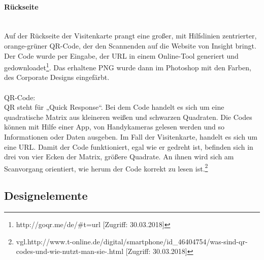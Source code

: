 \paragraph{Rückseite}
\leavevmode \\
Auf der Rückseite der Visitenkarte prangt eine großer, mit Hilfslinien zentrierter, orange-grüner QR-Code, der den Scannenden auf die Website von Insight bringt. Der Code wurde per Eingabe, der URL in einem Online-Tool generiert und gedownloadet\footnote{\label{} http://goqr.me/de/\#t=url [Zugriff: 30.03.2018]}. Das erhaltene PNG wurde dann im Photoshop mit den Farben, des Corporate Designs eingefärbt.
\leavevmode \\
\leavevmode \\
QR-Code:  
\leavevmode \\
QR steht für „Quick Response“. Bei dem Code handelt es sich um eine quadratische Matrix aus kleineren weißen und schwarzen Quadraten. Die Codes können mit Hilfe einer App, von Handykameras gelesen werden und so Informationen oder Daten ausgeben. Im Fall der Visitenkarte, handelt es sich um eine URL. Damit der Code funktioniert, egal wie er gedreht ist, befinden sich in drei von vier Ecken der Matrix, größere Quadrate. An ihnen wird sich am Scanvorgang orientiert, wie herum der Code korrekt zu lesen ist.\footnote{\label{} vgl.http://www.t-online.de/digital/smartphone/id\_46404754/was-sind-qr-codes-und-wie-nutzt-man-sie-.html [Zugriff: 30.03.2018]}

\subsection{Designelemente}
